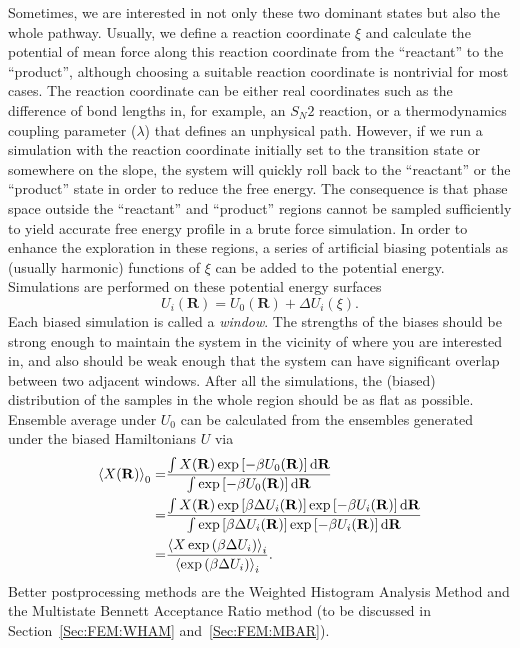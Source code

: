 Sometimes, we are interested in not only these two dominant states but also the whole pathway. Usually, we define a reaction coordinate $\xi$ and calculate the potential of mean force along this reaction coordinate from the ``reactant'' to the ``product'', although choosing a suitable reaction coordinate is nontrivial for most cases.\cite{LeitoldJCP2020} The reaction coordinate can be either real coordinates such as the difference of bond lengths in, for example, an $S_N2$ reaction, or a thermodynamics coupling parameter ($\lambda$) that defines an unphysical path. However, if we run a simulation with the reaction coordinate initially set to the transition state or somewhere on the slope, the system will quickly roll back to the ``reactant'' or the ``product'' state in order to reduce the free energy. The consequence is that phase space outside the ``reactant'' and ``product'' regions cannot be sampled sufficiently to yield accurate free energy profile in a brute force simulation. In order to enhance the exploration in these regions, a series of artificial biasing potentials as (usually harmonic) functions of $\xi$ can be added to the potential energy. Simulations are performed on these potential energy surfaces 
\begin{equation}
	U_i(\mathbf{R})=U_0(\mathbf{R})+\Delta U_i(\xi).
\end{equation}
Each biased simulation is called a \textit{window}. The strengths of the biases should be strong enough to maintain the system in the vicinity of where you are interested in, and also should be weak enough that the system can have significant overlap between two adjacent windows. After all the simulations, the (biased) distribution of the samples in the whole region should be as flat as possible. Ensemble average under $U_0$ can be calculated from the ensembles generated under the biased Hamiltonians $U$ via
\begin{align}
	\left<X(\mathbf{R})\right>_0=&\frac{\int X(\mathbf{R})\exp{\left[-\beta U_0(\mathbf{R})\right]}\mathop{}\!\mathrm{d}\mathbf{R}}{\int \exp{\left[-\beta U_0(\mathbf{R})\right]}\mathop{}\!\mathrm{d}\mathbf{R}}\notag\\
	                            =&\frac{\int X(\mathbf{R})\exp{\left[\beta \Delta U_i(\mathbf{R})\right]}\exp{\left[-\beta U_i(\mathbf{R})\right]}\mathop{}\!\mathrm{d}\mathbf{R}}{\int \exp{\left[\beta \Delta U_i(\mathbf{R})\right]}\exp{\left[-\beta U_i(\mathbf{R})\right]}\mathop{}\!\mathrm{d}\mathbf{R}}\notag\\
	                =&\frac{\left<X\exp{\left(\beta\Delta U_i\right)}\right>_i}{\left<\exp{\left(\beta\Delta U_i\right)}\right>_i}.
	\label{Eq:ES:US:reweighting}
\end{align}
Better postprocessing methods are the Weighted Histogram Analysis Method and the Multistate Bennett Acceptance Ratio method (to be discussed in Section~\ref{Sec:FEM:WHAM} and~\ref{Sec:FEM:MBAR}).